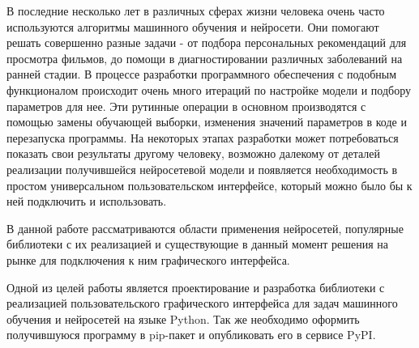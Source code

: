 \intro
В последние несколько лет в различных сферах жизни человека очень часто используются алгоритмы машинного обучения и нейросети. Они помогают решать совершенно разные задачи - от подбора персональных рекомендаций для просмотра фильмов, до помощи в диагностировании различных заболеваний на ранней стадии. В процессе разработки программного обеспечения с подобным функционалом происходит очень много итераций по настройке модели и подбору параметров для нее. Эти рутинные операции в основном производятся с помощью замены обучающей выборки, изменения значений параметров в коде и перезапуска программы. На некоторых этапах разработки может потребоваться показать свои результаты другому человеку, возможно далекому от деталей реализации получившейся нейросетевой модели и появляется необходимость в простом универсальном пользовательском интерфейсе, который можно было бы к ней подключить и использовать.

В данной работе рассматриваются области применения нейросетей, популярные библиотеки с их реализацией и существующие в данный момент решения на рынке для подключения к ним графического интерфейса. 

Одной из целей работы является проектирование и разработка библиотеки с реализацией пользовательского графического интерфейса для задач машинного обучения и нейросетей на языке Python. Так же необходимо оформить получившуюся программу в pip-пакет и опубликовать его в сервисе PyPI.